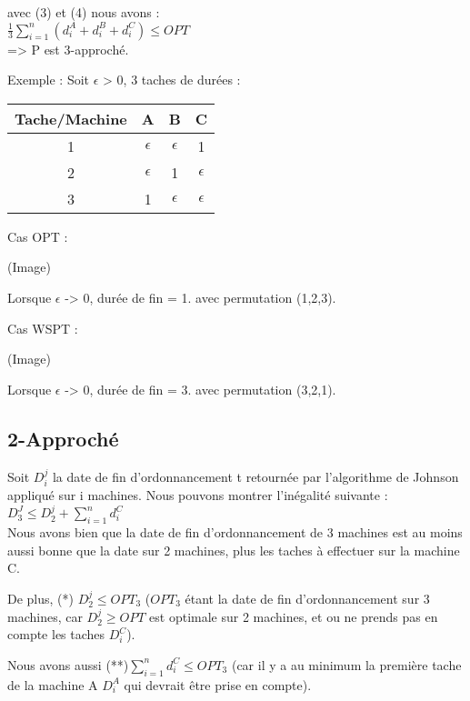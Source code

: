 \documentclass[12pt]{article}
\begin{document}
avec (3) et (4) nous avons :\\

$\frac{1}{3}\displaystyle\sum_{i=1}^n(d_i^A+d_i^B+d_i^C) \le OPT$\\

=> P est 3-approché.

Exemple : Soit $\epsilon$ > 0, 3 taches de durées :\\

\begin{tabular}{|c|c|c|c|}
\hline 
Tache/Machine & A & B & C \\ 
\hline 
1 & $\epsilon$ & $\epsilon$ & 1 \\ 
\hline 
2 & $\epsilon$ & 1 & $\epsilon$ \\ 
\hline 
3 & 1 & $\epsilon$ & $\epsilon$ \\ 
\hline 
\end{tabular} 

Cas OPT :

(Image)

Lorsque $\epsilon$ -> 0, durée de fin = 1. avec permutation (1,2,3).

Cas WSPT :

(Image)

Lorsque $\epsilon$ -> 0, durée de fin = 3. avec permutation (3,2,1).

\subsection{2-Approché}

Soit $D_i^j$ la date de fin d'ordonnancement t retournée par l'algorithme de Johnson appliqué sur i machines.
Nous pouvons montrer l'inégalité suivante : \\

$D_3^J \le D_2^j + \displaystyle\sum_{i=1}^n d_i^C$\\

Nous avons bien que la date de fin d'ordonnancement de 3 machines est au moins aussi bonne que la date sur 2 machines, plus les taches à effectuer sur la machine C.

De plus, (*) $D_2^j \le OPT_3$ ($OPT_3$ étant la date de fin d'ordonnancement sur 3 machines, car $D_2^j \ge OPT$ est optimale sur 2 machines, et ou ne prends pas en compte les taches $D_i^C$).

Nous avons aussi (**)$\displaystyle\sum_{i=1}^n d_i^C \le OPT_3$ (car il y a au minimum la première tache de la machine A $D_i^A$ qui devrait être prise en compte).
\end{document}
